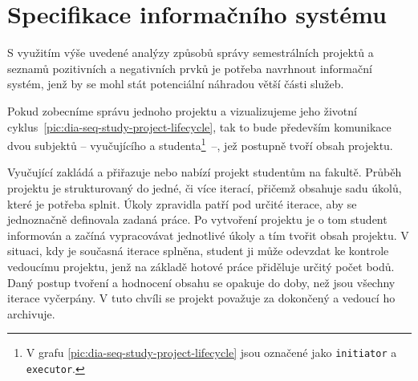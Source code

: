 \chapter{Specifikace informačního systému}

S využitím výše uvedené analýzy způsobů správy semestrálních projektů a seznamů pozitivních a negativních prvků je potřeba navrhnout informační systém, jenž by se mohl stát potenciální náhradou větší části služeb. 

Pokud zobecníme správu jednoho projektu a vizualizujeme jeho životní
cyklus~\ref{pic:dia-seq-study-project-lifecycle}, tak to bude především komunikace dvou subjektů -- vyučujícího a studenta\footnote{V grafu \ref{pic:dia-seq-study-project-lifecycle} jsou označené jako \texttt{initiator} a \texttt{executor}.}~--, jež postupně tvoří obsah projektu.

Vyučující zakládá a přiřazuje nebo nabízí projekt studentům na fakultě. Průběh projektu je strukturovaný do jedné, či více iterací, přičemž obsahuje sadu úkolů, které je potřeba splnit. Úkoly zpravidla patří pod určité iterace, aby se jednoznačně definovala zadaná práce. Po vytvoření projektu je o tom student informován a začíná vypracovávat jednotlivé úkoly a tím tvořit obsah projektu. V situaci, kdy je současná iterace splněna, student ji může odevzdat ke kontrole vedoucímu projektu, jenž na základě hotové práce přiděluje určitý počet bodů. Daný postup tvoření a hodnocení obsahu se opakuje do doby, než jsou všechny iterace vyčerpány. V tuto chvíli se projekt považuje za dokončený a vedoucí ho archivuje.


